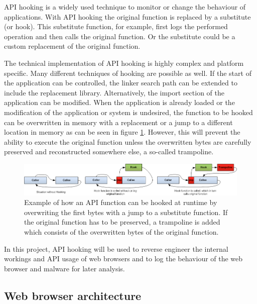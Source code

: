 API hooking is a widely used technique to monitor or change the behaviour of applications. With API hooking the original function is replaced by a substitute (or hook). This substitute function, for example, first logs the performed operation and then calls the original function. Or the substitute could be a custom replacement of the original function.

The technical implementation of API hooking is highly complex and platform specific. Many different techniques \cite{jbremer2012} of hooking are possible as well. If the start of the application can be controlled, the linker search path can be extended to include the replacement library. Alternatively, the import section of the application can be modified. When the application is already loaded or the modification of the application or system is undesired, the function to be hooked can be overwritten in memory with a replacement or a jump to a different location in memory as can be seen in figure \ref{fig:apihooking}. However, this will prevent the ability to execute the original function unless the overwritten bytes are carefully preserved and reconstructed somewhere else, a so-called trampoline.

\begin{figure}
    \centering
    \includegraphics[width=14.7cm]{Images/API-hooking.png}
    \caption{Example of how an API function can be hooked at runtime by overwriting the first bytes with a jump to a substitute function. If the original function has to be preserved, a trampoline is added which consists of the overwritten bytes of the original function. \cite{APIHookImage}}
    \label{fig:apihooking}
\end{figure}

In this project, API hooking will be used to reverse engineer the internal workings and API usage of web browsers and to log the behaviour of the web browser and malware for later analysis.




\subsection{Web browser architecture}

